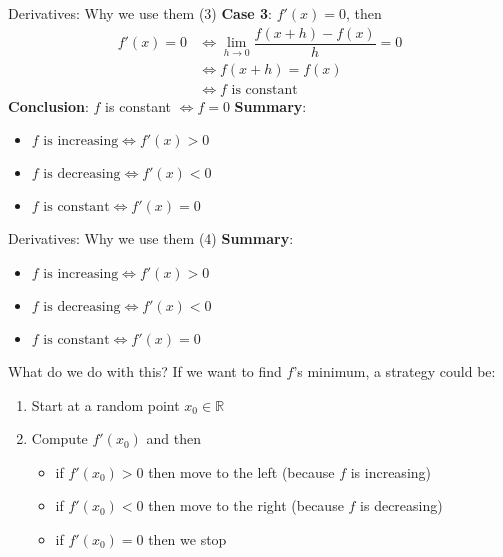 \documentclass{beamer}
\newcommand{\real}{\mathbb{R}}
\newcommand{\1}[1]{\mathbbm{1}\left[#1\right]}
\begin{document}
\begin{frame}{Derivatives: Why we use them (3)}
\textbf{Case 3}: $f'(x) = 0$, then 
\vfill
\pause
\begin{equation*}
\begin{split}
f'(x) = 0 & \iff \lim_{h \to 0}\dfrac{f(x + h) - f(x)}{h} = 0 \\
& \iff f(x + h) = f(x) \\
& \iff f \text{ is constant}
\end{split}
\end{equation*}
\vfill
\pause
\textbf{Conclusion}: $f$ is constant $\iff f = 0$
\vfill
\pause
\textbf{Summary}:
\begin{itemize}
	\item $f \text{ is increasing} \iff f'(x) > 0$
	\item $f \text{ is decreasing} \iff f'(x) < 0$
	\item $f \text{ is constant} \iff f'(x) = 0$
\end{itemize}
\end{frame}

\begin{frame}{Derivatives: Why we use them (4)}
\textbf{Summary}:
\begin{itemize}
	\item $f \text{ is increasing} \iff f'(x) > 0$
	\item $f \text{ is decreasing} \iff f'(x) < 0$
	\item $f \text{ is constant} \iff f'(x) = 0$
\end{itemize}
\vfill
\pause
What do we do with this?
\vfill
\pause
If we want to find $f$'s minimum, a strategy could be:
\begin{enumerate}
	\item Start at a random point $x_0 \in \real$
	\item Compute $f'(x_0)$ and then
	\begin{itemize}
		\item if $f'(x_0) > 0$ then move to the left (because $f$ is increasing) 
		\item if $f'(x_0) < 0$ then move to the right (because $f$ is decreasing)
		\item if $f'(x_0) = 0$ then we stop
	\end{itemize}
\end{enumerate}
\end{frame}
\end{document}
